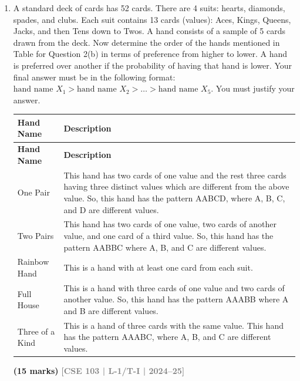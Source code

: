 \documentclass[12pt,a3paper]{article}
\newcommand{\yr}[1]{\hfill\textcolor{gray}{\small\textbf{[#1]}}}
\newcommand{\mk}[1]{\textcolor{orange!70!black}{\small\textbf{(#1 marks)}}}
\begin{document}
\begin{enumerate}

\item A standard deck of cards has 52 cards. There are 4 suits: hearts, diamonds, spades, and clubs. Each suit contains 13 cards (values): Aces, Kings, Queens, Jacks, and then Tens down to Twos. A hand consists of a sample of 5 cards drawn from the deck. Now determine the order of the hands mentioned in Table for Question 2(b) in terms of preference from higher to lower. A hand is preferred over another if the probability of having that hand is lower. Your final answer must be in the following format: $\text{hand name } X_1 > \text{hand name } X_2 > \dots > \text{hand name } X_5$. You must justify your answer.

\begin{longtable}{|l|p{10cm}|}
\hline
\textbf{Hand Name} & \textbf{Description} \\ \hline
\endfirsthead
\hline
\textbf{Hand Name} & \textbf{Description} \\ \hline
\endhead
\hline
\endfoot
\hline
\endlastfoot
One Pair & This hand has two cards of one value and the rest three cards having three distinct values which are different from the above value. So, this hand has the pattern AABCD, where A, B, C, and D are different values. \\ \hline
Two Pairs & This hand has two cards of one value, two cards of another value, and one card of a third value. So, this hand has the pattern AABBC where A, B, and C are different values. \\ \hline
Rainbow Hand & This is a hand with at least one card from each suit. \\ \hline
Full House & This is a hand with three cards of one value and two cards of another value. So, this hand has the pattern AAABB where A and B are different values. \\ \hline
Three of a Kind & This is a hand of three cards with the same value. This hand has the pattern AAABC, where A, B, and C are different values. \\ \hline
\end{longtable}
\mk{15} \yr{CSE 103 | L-1/T-I | 2024--25}


\end{enumerate}
\end{document}
